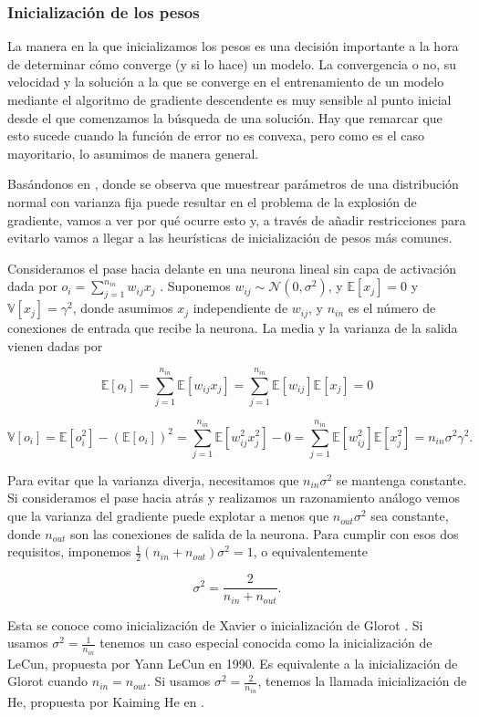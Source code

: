 \subsubsection{Inicialización de los pesos}

La manera en la que inicializamos los pesos es una decisión importante a la hora de determinar cómo converge (y si lo hace) un modelo. La convergencia o no, su velocidad y la solución a la que se converge en el entrenamiento de un modelo mediante el algoritmo de gradiente descendente es muy sensible al punto inicial desde el que comenzamos la búsqueda de una solución. Hay que remarcar que esto sucede cuando la función de error no es convexa, pero como es el caso mayoritario, lo asumimos de manera general.  

Basándonos en \cite{stabilityProblem2}, donde se observa que muestrear parámetros de una distribución normal con varianza fija puede resultar en el problema de la explosión de gradiente, vamos a ver por qué ocurre esto y, a través de añadir restricciones para evitarlo vamos a llegar a las heurísticas de inicialización de pesos más comunes.

Consideramos el pase hacia delante en una neurona lineal sin capa de activación dada por $o_i = \sum_{j=1}^{n_{in}} w_{ij}x_j$ . Suponemos $w_{ij} \sim \mathcal{N}(0, \sigma^2)$, y $\mathbb{E}[x_j]=0$ y $\mathbb{V}[x_j]=\gamma^2$, donde asumimos $x_j$ independiente de $w_{ij}$, y $n_{in}$ es el número de conexiones de entrada que recibe la neurona. La media y la varianza de la salida vienen dadas por

$$\mathbb{E}[o_i]= \sum_{j=1}^{n_{in}} \mathbb{E}[w_{ij} x_j] = \sum_{j=1}^{n_{in}} \mathbb{E}[w_{ij}] \mathbb{E}[x_j]=0$$

$$\mathbb{V}[o_i] = \mathbb{E}[o_i^2] - (\mathbb{E}[o_i])^2 = \sum_{j=1}^{n_{in}} \mathbb{E}[w_{ij}^2x_j^2] - 0 = \sum_{j=1}^{n_{in}} \mathbb{E}[w_{ij}^2] \mathbb{E}[x_j^2] = n_{in} \sigma^2 \gamma^2.$$

Para evitar que la varianza diverja, necesitamos que $n_{in} \sigma^2$ se mantenga constante. Si consideramos el pase hacia atrás y realizamos un razonamiento análogo vemos que la varianza del gradiente puede explotar a menos que $n_{out} \sigma^2$ sea constante, donde $n_{out}$ son las conexiones de salida de la neurona. Para cumplir con esos dos requisitos, imponemos $\frac{1}{2}(n_{in}+n_{out}) \sigma^2 = 1$, o equivalentemente

$$\sigma^2= \frac{2}{n_{in}+n_{out}}.$$

Esta se conoce como inicialización de Xavier o inicialización de Glorot \cite{stabilityProblem2}. Si usamos $\sigma^2= \frac{1}{n_{in}}$ tenemos un caso especial conocida como la inicialización de LeCun, propuesta por Yann LeCun en 1990. Es equivalente a la inicialización de Glorot cuando $n_{in}=n_{out}$. Si usamos $\sigma^2 = \frac{2}{n_{in}}$, tenemos la llamada inicialización de He, propuesta por Kaiming He en \cite{heinic}.


